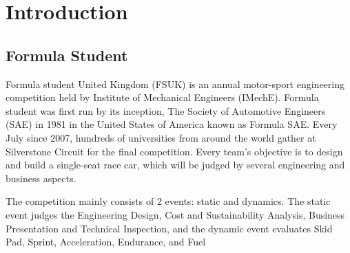 \newpage
\setcounter{page}{1}
\justifying
\noindent

\section{Introduction}
\subsection{Formula Student}
Formula student United Kingdom (FSUK) is an annual motor-sport engineering competition held by Institute of Mechanical Engineers (IMechE). Formula student was first run by its inception, The Society of Automotive Engineers (SAE) in 1981 in the United States of America known as Formula SAE. Every July since 2007, hundreds of universities from around the world gather at Silverstone Circuit for the final competition. Every team's objective is to design and build a single-seat race car, which will be judged by several engineering and business aspects.

\noindent The competition mainly consists of 2 events: static and dynamics. The static event judges the Engineering  Design,  Cost and  Sustainability  Analysis, Business Presentation and Technical Inspection, and the dynamic event evaluates Skid Pad, Sprint, Acceleration, Endurance, and Fuel 


